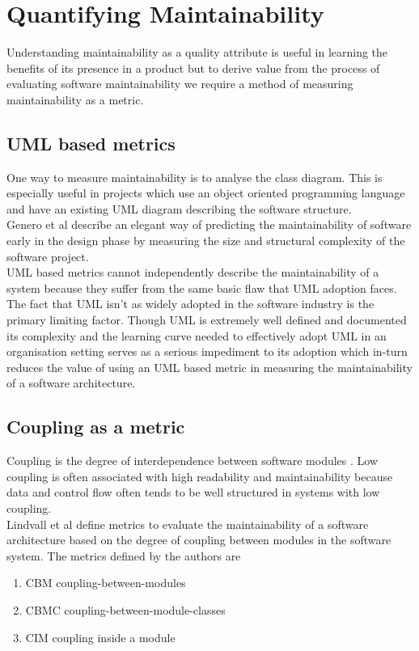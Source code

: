 \documentclass[dvips,12pt]{article}
\begin{document}
\section{Quantifying Maintainability}
Understanding maintainability as a quality attribute is useful in learning the benefits of  its presence in a product but to derive value from the process of evaluating software maintainability we require a method of measuring maintainability as a metric.

\subsection{UML based metrics}
One way to measure maintainability is to analyse the class diagram. This is especially useful in projects which use an object oriented programming language and have an existing UML diagram describing the software structure. \\


Genero et al \cite{genero_building_2003} \cite{genero_building_2007} describe an elegant way of predicting the maintainability of software early in the design phase by measuring the size and structural complexity of the software project. \\

UML based metrics cannot independently describe the maintainability of a system because they suffer from the same basic flaw that UML adoption faces. The fact that UML isn't as widely adopted in the software industry is the primary limiting factor. Though UML is extremely well defined and documented its complexity and the learning curve needed to effectively adopt UML in an organisation setting serves as a serious impediment to its adoption which in-turn reduces the value of using an UML based metric in measuring the maintainability of a software architecture.

\subsection{Coupling as a metric}

Coupling is the degree of interdependence between software modules \cite{_international_2006}. Low coupling is often associated with high readability and maintainability because data and control flow often tends to be well structured in systems with low coupling.\\

Lindvall et al define\cite{lindvall_empirically-based_2003} metrics to evaluate the maintainability of a software architecture based on the degree of coupling between modules in the software system. The metrics defined by the authors are
\begin{enumerate}
\item CBM coupling-between-modules
\item CBMC coupling-between-module-classes
\item CIM coupling inside a module
\end{enumerate}
\end{document}
